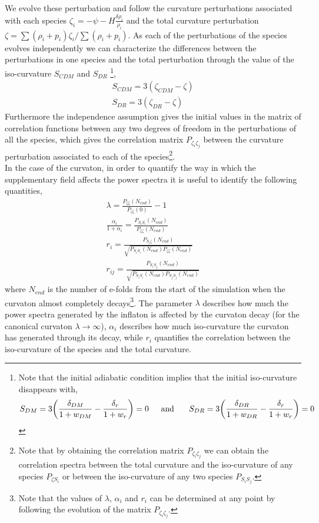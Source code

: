 \documentclass[11pt]{article}
\begin{document}
\indent We evolve these perturbation and follow the curvature perturbations associated with each species  $
\zeta_i = -\psi - H \frac{\delta \rho_i}{\dot \rho_i}
$ and the total curvature perturbation $\zeta = {\sum(\rho_i + p_i) \zeta_i}/{\sum(\rho_i + p_i)}$. As each of the perturbations of the species evolves independently we can characterize the differences between the perturbations in one species and the total perturbation through the value of the iso-curvature $S_{CDM}$ and $S_{DR}$ \footnote{Note that the initial adiabatic condition implies that the initial iso-curvature disappears with,
\begin{equation}
S_{DM}  = 3 \bigg(\frac{\delta_{DM}}{1 + w_{DM}} - \frac{\delta_r}{1 + w_r} \bigg) = 0
\mbox{\indent and \indent}
S_{DR}  = 3 \bigg(\frac{\delta_{DR}}{1 + w_{DR}} - \frac{\delta_r}{1 + w_r} \bigg) = 0
\end{equation}},  
\begin{eqnarray}
S_{CDM} = 3(\zeta_{CDM} - \zeta) \nonumber \\
S_{DR} = 3(\zeta_{DR} - \zeta) 
\end{eqnarray}
\indent Furthermore the independence assumption gives the initial values in the matrix of correlation functions between any two degrees of freedom in the perturbations of all the species, which gives the correlation matrix $P_{\zeta_i \zeta_j}$ between the curvature perturbation associated to each of the species\footnote{Note that by obtaining the correlation matrix $P_{\zeta_i \zeta_j}$ we can obtain the correlation spectra between the total curvature and the iso-curvature of any species $P_{\zeta S_i}$ or between the iso-curvature of any two species $P_{S_i S_j}$.
}. \\
\indent In the case of the curvaton, in order to quantify the way in which the supplementary field affects the power spectra it is useful to identify the following quantities, 
\begin{eqnarray}
\lambda = \frac{P_{\zeta \zeta}(N_{end})}{P_{\zeta \zeta}(0)} - 1 \\
\frac{\alpha_i}{1 + \alpha_i} = \frac{P_{S_i S_i}(N_{end})}{P_{\zeta \zeta}(N_{end})} \\
r_i = \frac{P_{S_i \zeta}(N_{end})}{\sqrt{P_{S_i S_i}(N_{end}) P_{\zeta \zeta}(N_{end})}}\\
r_{ij} = \frac{P_{S_i S_j}(N_{end})}{\sqrt{P_{S_i S_i}(N_{end}) P_{S_j S_j}(N_{end})}}
\end{eqnarray}
where $N_{end}$ is the number of e-folds from the start of the simulation when the curvaton almost completely decays\footnote{Note that the values of $\lambda$, $\alpha_i$ and $r_i$ can be determined at any point by following the evolution of the matrix $P_{\zeta_i \zeta_j}$.}. The parameter $\lambda$ describes how much the power spectra generated by the inflaton is affected by the curvaton decay (for the canonical curvaton $\lambda \rightarrow \infty$), $\alpha_i$ describes how much iso-curvature the curvaton has generated through its decay, while $r_i$ quantifies the correlation between the iso-curvature of the species and the total curvature. \\
\end{document}

